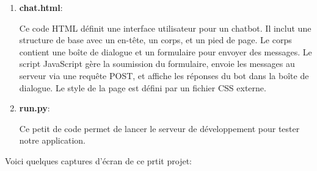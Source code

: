 \documentclass[a4paper,11pt]{article}
\begin{document}
\begin{enumerate}
                \item \textbf{chat.html}: 
                    
                    \noindent Ce code HTML définit une interface utilisateur pour un chatbot. Il inclut une structure de base avec un en-tête, 
                    un corps, et un pied de page. Le corps contient une boîte de dialogue et un formulaire pour envoyer des messages. 
                    Le script JavaScript gère la soumission du formulaire, envoie les messages au serveur via une requête POST, et affiche les réponses du bot dans la boîte de dialogue. 
                    Le style de la page est défini par un fichier CSS externe.

                \item \textbf{run.py}:
                    
                    \noindent Ce petit de code permet de lancer le serveur de développement pour tester notre application.
            \end{enumerate}

        \newpage
        \noindent Voici quelques captures d'écran de ce prtit projet: 
\end{document}
